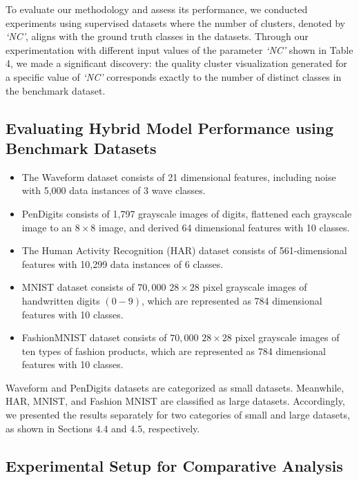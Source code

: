 To evaluate our methodology and assess its performance, we conducted experiments using supervised datasets where the number of clusters, denoted by \textit{`NC'}, aligns with the ground truth classes in the datasets. Through our experimentation with different input values of the parameter \textit{`NC'} shown in Table 4, we made a significant discovery: the quality cluster visualization generated for a specific value of \textit{`NC'} corresponds exactly to the number of distinct classes in the benchmark dataset.


\subsection{Evaluating Hybrid Model Performance using Benchmark Datasets}


\begin{itemize}
    \item The Waveform \cite{waveform} dataset consists of 21 dimensional features, including noise with 5,000 data instances of 3 wave classes.
    \item PenDigits \cite{pendigits} consists of 1,797 grayscale images of digits, flattened each grayscale image to an $8\times8$ image, and derived 64 dimensional features with 10 classes.
    \item The Human Activity Recognition (HAR) dataset \cite{har} consists of 561-dimensional features with 10,299 data instances of 6 classes.
    \item MNIST \cite{deng2012mnist} dataset consists of $70,000$ $28\times 28$  pixel grayscale images of handwritten digits $(0-9)$, which are represented as 784 dimensional features with 10 classes.
    \item FashionMNIST \cite{fashionmnist} dataset consists of $70,000$ $28\times28$  pixel grayscale images of ten types of fashion products, which are represented as 784 dimensional features with 10 classes.
\end{itemize}
Waveform and PenDigits datasets are categorized as small datasets. Meanwhile, HAR, MNIST, and Fashion MNIST are classified as large datasets. Accordingly, we presented the results separately for two categories of small and large datasets, as shown in Sections $4.4$ and $4.5$, respectively.

\subsection{Experimental Setup for Comparative Analysis}

